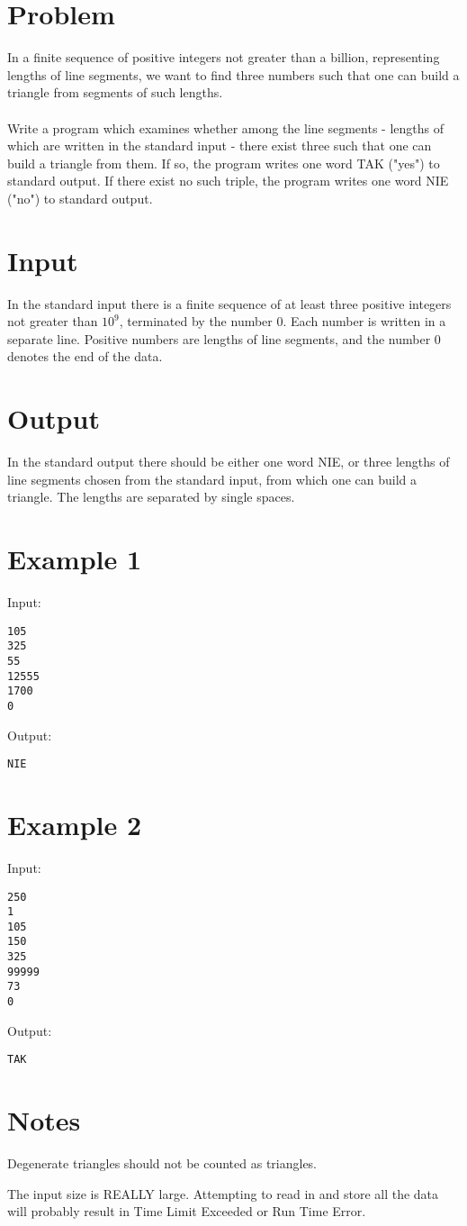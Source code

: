 \documentclass[11pt]{article}
\begin{document}
\section*{Problem}
In a finite sequence of positive integers not greater than a billion,
representing lengths of line segments, we want to find three numbers such that
one can build a triangle from segments of such lengths.
\\\\
Write a program which examines whether among the line segments - lengths of
which are written in the standard input - there exist three such that one can
build a triangle from them. If so, the program writes one word TAK ("yes") to
standard output. If there exist no such triple, the program writes one word NIE
("no") to standard output.
\section*{Input}
In the standard input there is a finite sequence of at least three positive
integers not greater than $10^9$, terminated by the number $0$. Each number is
written in a separate line. Positive numbers are lengths of line segments, and
the number $0$ denotes the end of the data.
\section*{Output}
In the standard output there should be either one word NIE, or three lengths of
line segments chosen from the standard input, from which one can build a
triangle. The lengths are separated by single spaces.
\section*{Example 1}
Input:

\begin{verbatim}
105
325
55
12555
1700
0
\end{verbatim}

\noindent Output:

\begin{verbatim}
NIE
\end{verbatim}
\section*{Example 2}
Input:

\begin{verbatim}
250
1
105
150
325
99999
73
0
\end{verbatim}

\noindent Output:

\begin{verbatim}
TAK
\end{verbatim}

\section*{Notes}

Degenerate triangles should not be counted as triangles.

The input size is REALLY large. Attempting to read in and store all the data will probably result in Time Limit Exceeded or Run Time Error.
\end{document}
